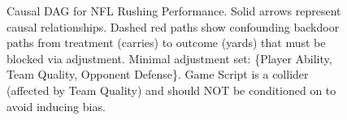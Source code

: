 \begin{figure}[htbp]
\begin{tikzpicture}
\end{tikzpicture}
\caption{Causal DAG for NFL Rushing Performance. Solid arrows represent causal relationships. Dashed red paths show confounding backdoor paths from treatment (carries) to outcome (yards) that must be blocked via adjustment. Minimal adjustment set: \{Player Ability, Team Quality, Opponent Defense\}. Game Script is a collider (affected by Team Quality) and should NOT be conditioned on to avoid inducing bias.}
\label{fig:causal-dag-rushing}
\end{figure}
